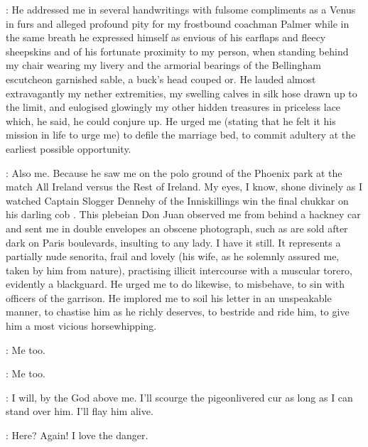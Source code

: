 \Bellingham:
He addressed me in several handwritings with fulsome compliments
as a Venus in furs and alleged profound pity for my frostbound coachman Palmer
while in the same breath he expressed himself
as envious of his earflaps and fleecy sheepskins
and of his fortunate proximity to my person,
when standing behind my chair wearing my livery
and the armorial bearings of the Bellingham escutcheon garnished sable,
a buck's head couped or.
He lauded almost extravagantly my nether extremities,
my swelling calves in silk hose drawn up to the limit,
and eulogised glowingly my other hidden treasures in priceless lace
which, he said, he could conjure up.
He urged me (stating that he felt it his mission in life to urge me)
to defile the marriage bed, to commit adultery at the earliest possible opportunity.

\Talboys:
Also me.
Because he saw me on the polo ground of the Phoenix park
at the match All Ireland versus the Rest of Ireland.
My eyes, I know, shone divinely as I watched Captain Slogger Dennehy
of the Inniskillings win the final chukkar on his darling cob .
This plebeian Don Juan observed me from behind a hackney car
and sent me in double envelopes an obscene photograph,
such as are sold after dark on Paris boulevards, insulting to any lady.
I have it still.
It represents a partially nude senorita, frail and lovely
(his wife, as he solemnly assured me, taken by him from nature),
practising illicit intercourse with a muscular torero, evidently a blackguard.
He urged me to do likewise, to misbehave, to sin with officers of the garrison.
He implored me to soil his letter in an unspeakable manner,
to chastise him as he richly deserves, to bestride and ride him,
to give him a most vicious horsewhipping.

\Bellingham:
Me too.

\Yelverton:
Me too.


\Talboys:
I will, by the God above me.
I'll scourge the pigeonlivered cur as long as I can stand over him.
I'll flay him alive.

\Bloom:
Here?
Again!
I love the danger.


